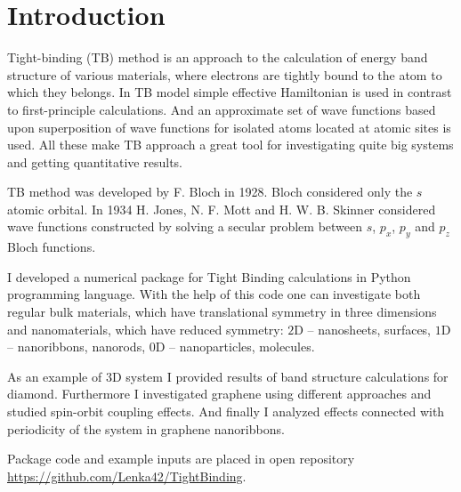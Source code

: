 \chapter{Introduction}
\label{ch:introduction}
Tight-binding (TB) method is an approach to the calculation of energy band structure of various materials, where electrons are tightly bound to the atom to which they belongs. In TB model simple effective Hamiltonian is used in contrast to first-principle calculations. And an approximate set of wave functions based upon superposition of wave functions for isolated atoms located at atomic sites is used. All these make TB approach a great tool for investigating quite big systems and getting quantitative results.

TB method was developed by F. Bloch \cite{bloch} in 1928.  Bloch considered only the $s$ atomic orbital. In 1934 H. Jones, N. F. Mott and H. W. B. Skinner \cite{mott} considered wave functions constructed by solving a secular problem between $s$, $p_x$, $p_y$ and $p_z$ Bloch functions.

I developed a numerical package for Tight Binding calculations in Python programming language. With the help of this code one can investigate both regular bulk materials, which have translational symmetry in three dimensions and nanomaterials, which have reduced symmetry: $2$D -- nanosheets, surfaces, $1$D -- nanoribbons, nanorods, $0$D -- nanoparticles, molecules.

As an example of 3D system I provided results of band structure calculations for diamond. Furthermore I investigated graphene using different approaches and studied spin-orbit coupling effects. And finally I analyzed effects connected with periodicity of the system in graphene nanoribbons.

Package code and example inputs are placed in open repository \url{https://github.com/Lenka42/TightBinding}.